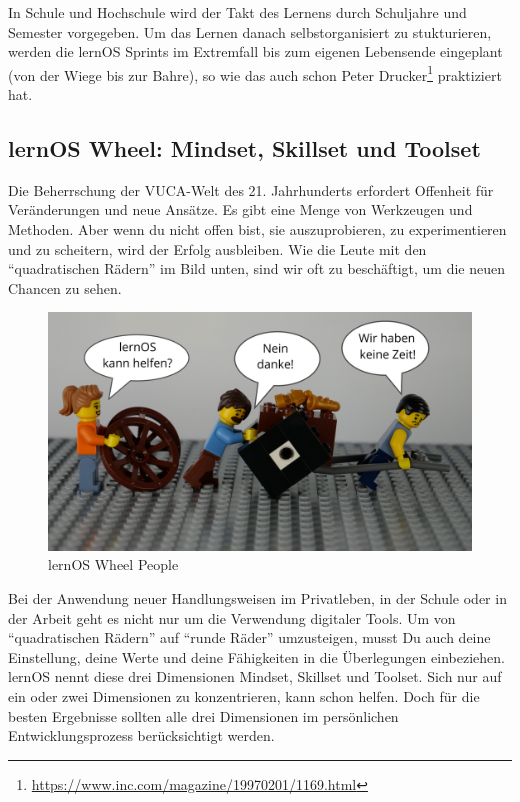 \documentclass[
  ngerman,
  paper=a4,
,captions=tableheading
]{scrartcl}
\DeclareRobustCommand{\href}[2]{#2\footnote{\url{#1}}}
\begin{document}
In Schule und Hochschule wird der Takt des Lernens durch Schuljahre und
Semester vorgegeben. Um das Lernen danach selbstorganisiert zu
stukturieren, werden die lernOS Sprints im Extremfall bis zum eigenen
Lebensende eingeplant (von der Wiege bis zur Bahre), so wie das
\href{https://www.inc.com/magazine/19970201/1169.html}{auch schon Peter
Drucker} praktiziert hat.

\hypertarget{lernos-wheel-mindset-skillset-und-toolset}{%
\subsection{lernOS Wheel: Mindset, Skillset und
Toolset}\label{lernos-wheel-mindset-skillset-und-toolset}}

Die Beherrschung der VUCA-Welt des 21. Jahrhunderts erfordert Offenheit
für Veränderungen und neue Ansätze. Es gibt eine Menge von Werkzeugen
und Methoden. Aber wenn du nicht offen bist, sie auszuprobieren, zu
experimentieren und zu scheitern, wird der Erfolg ausbleiben. Wie die
Leute mit den ``quadratischen Rädern'' im Bild unten, sind wir oft zu
beschäftigt, um die neuen Chancen zu sehen.

\begin{figure}
\centering
\includegraphics{./tex2pdf.-af94b87e0fdb9aa6/df19bf99afbb44721e135e9eea2ed49ab82560e2.png}
\caption{lernOS Wheel People}
\end{figure}

Bei der Anwendung neuer Handlungsweisen im Privatleben, in der Schule
oder in der Arbeit geht es nicht nur um die Verwendung digitaler Tools.
Um von ``quadratischen Rädern'' auf ``runde Räder'' umzusteigen, musst
Du auch deine Einstellung, deine Werte und deine Fähigkeiten in die
Überlegungen einbeziehen. lernOS nennt diese drei Dimensionen Mindset,
Skillset und Toolset. Sich nur auf ein oder zwei Dimensionen zu
konzentrieren, kann schon helfen. Doch für die besten Ergebnisse sollten
alle drei Dimensionen im persönlichen Entwicklungsprozess berücksichtigt
werden.
\end{document}
